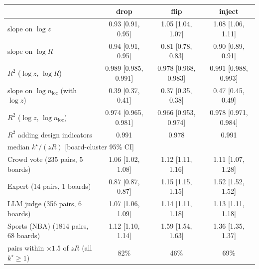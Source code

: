 \begin{tabular}{lccc}
\toprule
 & drop & flip & inject \\
\midrule
slope on $\log z$ & 0.93 [0.91, 0.95] & 1.05 [1.04, 1.07] & 1.08 [1.06, 1.11] \\
slope on $\log R$ & 0.94 [0.91, 0.95] & 0.81 [0.78, 0.83] & 0.90 [0.89, 0.91] \\
$R^2$ ($\log z$, $\log R$) & 0.989 [0.985, 0.991] & 0.978 [0.968, 0.983] & 0.991 [0.988, 0.993] \\
slope on $\log n_{\mathrm{loc}}$ (with $\log z$) & 0.39 [0.37, 0.41] & 0.37 [0.35, 0.38] & 0.47 [0.45, 0.49] \\
$R^2$ ($\log z$, $\log n_{\mathrm{loc}}$) & 0.974 [0.965, 0.981] & 0.966 [0.953, 0.974] & 0.978 [0.971, 0.984] \\
$R^2$ adding design indicators & 0.991 & 0.978 & 0.991 \\
\midrule
\multicolumn{4}{l}{median $k^\star/(z R)$ [board-cluster 95\% CI]} \\
\quad Crowd vote (235 pairs, 5 boards) & 1.06 [1.02, 1.08] & 1.12 [1.11, 1.16] & 1.11 [1.07, 1.28] \\
\quad Expert (14 pairs, 1 boards) & 0.87 [0.87, 0.87] & 1.15 [1.15, 1.15] & 1.52 [1.52, 1.52] \\
\quad LLM judge (356 pairs, 6 boards) & 1.07 [1.06, 1.09] & 1.14 [1.11, 1.18] & 1.13 [1.11, 1.18] \\
\quad Sports (NBA) (1814 pairs, 68 boards) & 1.12 [1.10, 1.14] & 1.59 [1.54, 1.63] & 1.36 [1.35, 1.37] \\
\midrule
pairs within $\times1.5$ of $zR$ (all $k^\star\ge1$) & 82\% & 46\% & 69\% \\
\bottomrule
\end{tabular}

